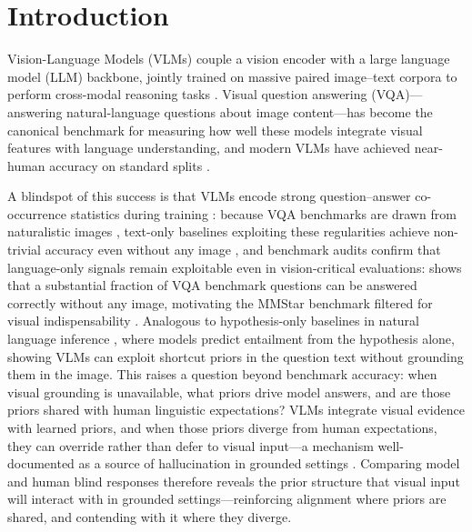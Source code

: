 \documentclass[letterpaper]{article}
\begin{document}
\section{Introduction}

Vision-Language Models (VLMs) couple a vision encoder with a large language
model (LLM) backbone, jointly trained on massive paired image--text corpora to
perform cross-modal reasoning tasks \citep{liu2023visual,zhang2023multimodal}.
Visual question answering (VQA)---answering natural-language questions about
image content---has become the canonical benchmark for measuring how well these
models integrate visual features with language understanding, and modern VLMs have achieved near-human accuracy on standard splits \citep{antol2015vqa,goyal2016making}.

A blindspot of this success is that VLMs encode strong question--answer
co-occurrence statistics during training \citep{mccoy2024embers}: because VQA
benchmarks are drawn from naturalistic images \citep{torralba2011unbiased},
text-only baselines exploiting these regularities achieve non-trivial
accuracy even without any image \citep{jabri2016revisiting,zhang2016yin,agrawal2018dont},
and benchmark audits confirm that language-only signals remain exploitable
even in vision-critical evaluations: \citet{chen2024are} shows that a substantial
fraction of VQA benchmark questions can be answered correctly
without any image, motivating the MMStar benchmark filtered for visual
indispensability \citep{chen2024are,lee2024vlind}.
Analogous to hypothesis-only baselines in natural language inference
\citep{poliak2018hypothesis}, where models predict entailment from the
hypothesis alone, showing VLMs can exploit shortcut priors in the question text without grounding them in the image.
This raises a question beyond benchmark accuracy: when visual grounding is
unavailable, what priors drive model answers, and are those priors shared
with human linguistic expectations?
VLMs integrate visual evidence with learned priors, and when those priors diverge
from human expectations, they can override rather than defer to visual input---a
mechanism well-documented as a source of hallucination in grounded settings
\citep{ji2023survey,rohrbach2018object}.
Comparing model and human blind responses therefore reveals the prior structure
that visual input will interact with in grounded settings---reinforcing alignment
where priors are shared, and contending with it where they diverge.
\end{document}

